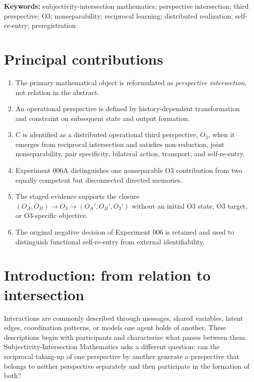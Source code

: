 \documentclass[11pt,a4paper]{article}
\newcommand{\OA}{\ensuremath{O_{A}}}
\newcommand{\OB}{\ensuremath{O_{B}}}
\newcommand{\Othree}{\ensuremath{O_{3}}}
\begin{document}
\noindent\textbf{Keywords:} subjectivity-intersection mathematics; perspective intersection; third perspective; O3; nonseparability; reciprocal learning; distributed realization; self-re-entry; preregistration

\section*{Principal contributions}
{\small
\begin{enumerate}[itemsep=0.1em,topsep=0.25em]
  \item The primary mathematical object is reformulated as \emph{perspective intersection}, not relation in the abstract.
  \item An operational perspective is defined by history-dependent transformation and constraint on subsequent state and output formation.
  \item C is identified as a distributed operational third perspective, \Othree, when it emerges from reciprocal intersection and satisfies non-reduction, joint nonseparability, pair specificity, bilateral action, transport, and self-re-entry.
  \item Experiment 006A distinguishes one nonseparable O3 contribution from two equally competent but disconnected directed memories.
  \item The staged evidence supports the closure $(\OA,\OB)\rightarrow\Othree\rightarrow(\OA',\OB',\Othree')$ without an initial O3 state, O3 target, or O3-specific objective.
  \item The original negative decision of Experiment 006 is retained and used to distinguish functional self-re-entry from external identifiability.
\end{enumerate}
}

\clearpage
{\small
\setlength{\parskip}{0pt}
\tableofcontents
}
\clearpage

\section{Introduction: from relation to intersection}

Interactions are commonly described through messages, shared variables, latent edges, coordination patterns, or models one agent holds of another. These descriptions begin with participants and characterize what passes between them. Subjectivity-Intersection Mathematics asks a different question: can the reciprocal taking-up of one perspective by another generate a perspective that belongs to neither perspective separately and then participate in the formation of both?
\end{document}
